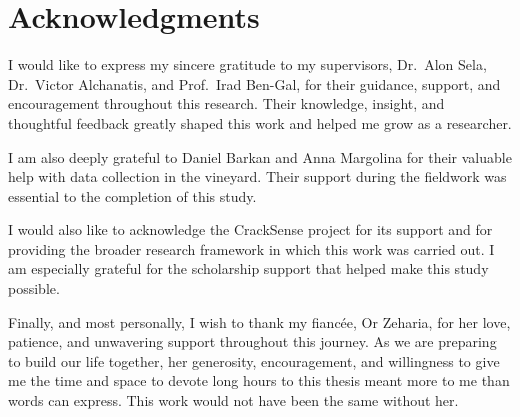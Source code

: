 \chapter*{Acknowledgments}

\medskip
\noindent
I would like to express my sincere gratitude to my supervisors, Dr.\ Alon Sela, Dr.\ Victor Alchanatis, and Prof.\ Irad Ben-Gal, for their guidance, support, and encouragement throughout this research. Their knowledge, insight, and thoughtful feedback greatly shaped this work and helped me grow as a researcher.

\medskip
\noindent
I am also deeply grateful to Daniel Barkan and Anna Margolina for their valuable help with data collection in the vineyard. Their support during the fieldwork was essential to the completion of this study.

\medskip
\noindent
I would also like to acknowledge the CrackSense project for its support and for providing the broader research framework in which this work was carried out. I am especially grateful for the scholarship support that helped make this study possible.

\medskip
\noindent
Finally, and most personally, I wish to thank my fiancée, Or Zeharia, for her love, patience, and unwavering support throughout this journey. As we are preparing to build our life together, her generosity, encouragement, and willingness to give me the time and space to devote long hours to this thesis meant more to me than words can express. This work would not have been the same without her.
